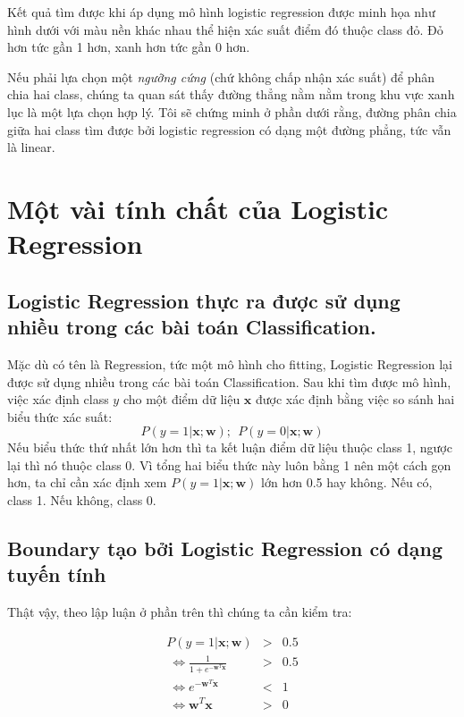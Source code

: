 {Kết quả tìm được khi áp dụng mô hình logistic regression được minh họa như hình dưới với màu nền khác nhau thể hiện xác suất điểm đó thuộc class đỏ. Đỏ hơn tức gần 1 hơn, xanh hơn tức gần 0 hơn. 
 
Nếu phải lựa chọn một \textit{ngưỡng cứng} (chứ không chấp nhận xác suất) để phân chia hai class, chúng ta quan sát thấy đường thẳng nằm nằm trong khu vực xanh lục là một lựa chọn hợp lý. Tôi sẽ chứng minh ở phần dưới rằng, đường phân chia giữa hai class tìm được bởi logistic regression có dạng một đường phẳng, tức vẫn là linear. 
 
 
 
\section{Một vài tính chất của Logistic Regression}
 
 
\subsection{Logistic Regression thực ra được sử dụng nhiều trong các bài toán Classification.}
Mặc dù có tên là Regression, tức một mô hình cho fitting, Logistic Regression lại được sử dụng nhiều trong các bài toán Classification. Sau khi tìm được mô hình, việc xác định class $y$ cho một điểm dữ liệu $\mathbf{x}$ được xác định bằng việc so sánh hai biểu thức xác suất: 
\begin{equation*} 
P(y = 1| \mathbf{x}; \mathbf{w}); ~~ P(y = 0| \mathbf{x}; \mathbf{w})  
\end{equation*} 
Nếu biểu thức thứ nhất lớn hơn thì ta kết luận điểm dữ liệu thuộc class 1, ngược lại thì nó thuộc class 0. Vì tổng hai biểu thức này luôn bằng 1 nên một cách gọn hơn, ta chỉ cần xác định xem $P(y = 1| \mathbf{x}; \mathbf{w})$ lớn hơn 0.5 hay không. Nếu có, class 1. Nếu không, class 0.  
 
 
\subsection{Boundary tạo bởi Logistic Regression có dạng tuyến tính}
Thật vậy, theo lập luận ở phần trên thì chúng ta cần kiểm tra: 
 
\begin{eqnarray*}
P(y = 1| \mathbf{x}; \mathbf{w}) &>& 0.5 \\\ 
\Leftrightarrow \frac{1}{1 + e^{-\mathbf{w}^T\mathbf{x}}} &>& 0.5 \\\ 
\Leftrightarrow e^{-\mathbf{w}^T\mathbf{x}} &<& 1 \\\ 
\Leftrightarrow \mathbf{w}^T\mathbf{x} &>& 0 
\end{eqnarray*}
 
}
